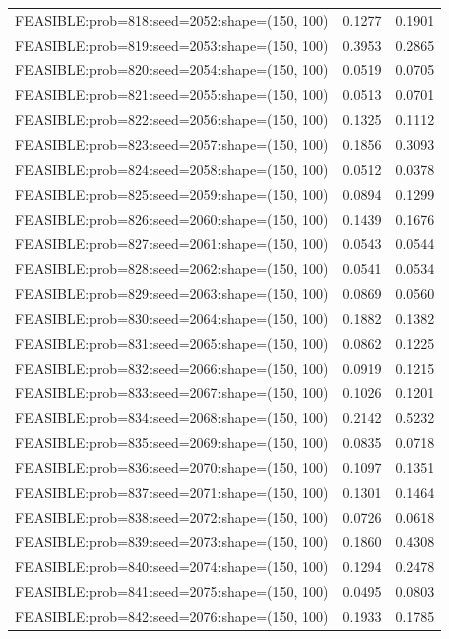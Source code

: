 \begin{longtable}{lcc}
FEASIBLE:prob=818:seed=2052:shape=(150, 100) &   0.1277 & 0.1901 \\
FEASIBLE:prob=819:seed=2053:shape=(150, 100) &   0.3953 & 0.2865 \\
FEASIBLE:prob=820:seed=2054:shape=(150, 100) &   0.0519 & 0.0705 \\
FEASIBLE:prob=821:seed=2055:shape=(150, 100) &   0.0513 & 0.0701 \\
FEASIBLE:prob=822:seed=2056:shape=(150, 100) &   0.1325 & 0.1112 \\
FEASIBLE:prob=823:seed=2057:shape=(150, 100) &   0.1856 & 0.3093 \\
FEASIBLE:prob=824:seed=2058:shape=(150, 100) &   0.0512 & 0.0378 \\
FEASIBLE:prob=825:seed=2059:shape=(150, 100) &   0.0894 & 0.1299 \\
FEASIBLE:prob=826:seed=2060:shape=(150, 100) &   0.1439 & 0.1676 \\
FEASIBLE:prob=827:seed=2061:shape=(150, 100) &   0.0543 & 0.0544 \\
FEASIBLE:prob=828:seed=2062:shape=(150, 100) &   0.0541 & 0.0534 \\
FEASIBLE:prob=829:seed=2063:shape=(150, 100) &   0.0869 & 0.0560 \\
FEASIBLE:prob=830:seed=2064:shape=(150, 100) &   0.1882 & 0.1382 \\
FEASIBLE:prob=831:seed=2065:shape=(150, 100) &   0.0862 & 0.1225 \\
FEASIBLE:prob=832:seed=2066:shape=(150, 100) &   0.0919 & 0.1215 \\
FEASIBLE:prob=833:seed=2067:shape=(150, 100) &   0.1026 & 0.1201 \\
FEASIBLE:prob=834:seed=2068:shape=(150, 100) &   0.2142 & 0.5232 \\
FEASIBLE:prob=835:seed=2069:shape=(150, 100) &   0.0835 & 0.0718 \\
FEASIBLE:prob=836:seed=2070:shape=(150, 100) &   0.1097 & 0.1351 \\
FEASIBLE:prob=837:seed=2071:shape=(150, 100) &   0.1301 & 0.1464 \\
FEASIBLE:prob=838:seed=2072:shape=(150, 100) &   0.0726 & 0.0618 \\
FEASIBLE:prob=839:seed=2073:shape=(150, 100) &   0.1860 & 0.4308 \\
FEASIBLE:prob=840:seed=2074:shape=(150, 100) &   0.1294 & 0.2478 \\
FEASIBLE:prob=841:seed=2075:shape=(150, 100) &   0.0495 & 0.0803 \\
FEASIBLE:prob=842:seed=2076:shape=(150, 100) &   0.1933 & 0.1785 \\

\end{longtable}
